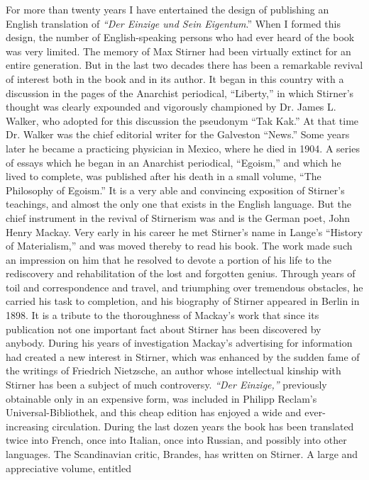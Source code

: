 \documentclass[12pt,a4paper]{book}
\begin{document}
For more than twenty years I have entertained the design of publishing an 
English translation of \textit{``Der Einzige und Sein Eigentum}.'' When I 
formed this design, the number of English-speaking persons who had ever heard 
of the book was very limited. The memory of Max Stirner had been virtually 
extinct for an entire generation. But in the last two decades there has been a 
remarkable revival of interest both in the book and in its author. It began in 
this country with a discussion in the pages of the Anarchist periodical, 
``Liberty,'' in which Stirner's thought was clearly expounded and vigorously 
championed by Dr. James L. Walker, who adopted for this discussion the 
pseudonym ``Tak Kak.'' At that time Dr. Walker was the chief editorial 
writer for the Galveston ``News.'' Some years later he became a practicing 
physician in Mexico, where he died in 1904. A series of essays which he began 
in an Anarchist periodical, ``Egoism,'' and which he lived to complete, was 
published after his death in a small volume, ``The Philosophy of Egoism.'' 
It is a very able and convincing exposition of Stirner's teachings, and almost 
the only one that exists in the English language. But the chief instrument in 
the revival of Stirnerism was and is the German poet, John Henry Mackay. Very 
early in his career he met Stirner's name in Lange's ``History of 
Materialism,'' and was moved thereby to read his book. The work made such an 
impression on him that he resolved to devote a portion of his life to the 
rediscovery and rehabilitation of the lost and forgotten genius. Through years 
of toil and correspondence and travel, and triumphing over tremendous 
obstacles, he carried his task to completion, and his biography of Stirner 
appeared in Berlin in 1898. It is a tribute to the thoroughness of Mackay's 
work that since its publication not one important fact about Stirner has been 
discovered by anybody. During his years of investigation Mackay's advertising 
for information had created a new interest in Stirner, which was enhanced by 
the sudden fame of the writings of Friedrich Nietzsche, an author whose 
intellectual kinship with Stirner has been a subject of much controversy. 
\textit{``Der Einzige,''} previously obtainable only in an expensive form, 
was included in Philipp Reclam's Universal-Bibliothek, and this cheap edition 
has enjoyed a wide and ever-increasing circulation. During the last dozen 
years the book has been translated twice into French, once into Italian, once 
into Russian, and possibly into other languages. The Scandinavian critic, 
Brandes, has written on Stirner. A large and appreciative volume, entitled 
\end{document}
